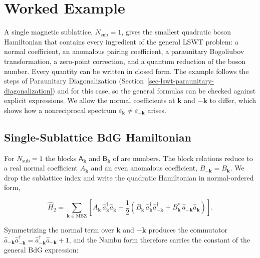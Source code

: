 
\hypertarget{sec-lswt-worked-example}{%
\section{Worked Example}\label{sec-lswt-worked-example}}

A single magnetic sublattice, \(N_{\mathrm{sub}}=1\), gives the smallest quadratic boson Hamiltonian that contains every ingredient of the general LSWT problem: a normal coefficient, an anomalous pairing coefficient, a paraunitary Bogoliubov transformation, a zero-point correction, and a quantum reduction of the boson number. Every quantity can be written in closed form. The example follows the steps of Paraunitary Diagonalization (Section~\ref{sec-lswt-paraunitary-diagonalization}) and  for this case, so the general formulas can be checked against explicit expressions. We allow the normal coefficients at \(\mathbf k\) and \(-\mathbf k\) to differ, which shows how a nonreciprocal spectrum \(\varepsilon_{\mathbf k}\ne\varepsilon_{-\mathbf k}\) arises.

\subsection{Single-Sublattice BdG Hamiltonian}

For \(N_{\mathrm{sub}}=1\) the blocks \(\mathsf A_{\mathbf k}\) and \(\mathsf B_{\mathbf k}\) of  are numbers. The block relations reduce to a real normal coefficient \(A_{\mathbf k}\) and an even anomalous coefficient, \(B_{-\mathbf k}=B_{\mathbf k}\). We drop the sublattice index and write the quadratic Hamiltonian in normal-ordered form,

\[
\hat H_2
=\sum_{\mathbf k\in\mathrm{MBZ}}\left[A_{\mathbf k}\,\hat a_{\mathbf k}^\dagger\hat a_{\mathbf k}
+\frac12\left(B_{\mathbf k}\,\hat a_{\mathbf k}^\dagger\hat a_{-\mathbf k}^\dagger+B_{\mathbf k}^*\,\hat a_{-\mathbf k}\hat a_{\mathbf k}\right)\right].
\]

Symmetrizing the normal term over \(\mathbf k\) and \(-\mathbf k\) produces the commutator \(\hat a_{-\mathbf k}\hat a_{-\mathbf k}^\dagger=\hat a_{-\mathbf k}^\dagger\hat a_{-\mathbf k}+1\), and the Nambu form therefore carries the constant of the general BdG expression:

